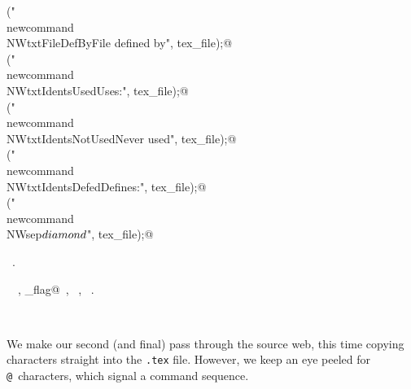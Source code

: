 \documentclass{report}
\begin{document}
\begin{flushleft}
\begin{minipage}{\linewidth}
\begin{list}{}{}
\mbox{}\verb@fputs("\\newcommand{\\NWtxtFileDefBy}{File defined by}\n", tex_file);@\\
\mbox{}\verb@fputs("\\newcommand{\\NWtxtIdentsUsed}{Uses:}\n", tex_file);@\\
\mbox{}\verb@fputs("\\newcommand{\\NWtxtIdentsNotUsed}{Never used}\n", tex_file);@\\
\mbox{}\verb@fputs("\\newcommand{\\NWtxtIdentsDefed}{Defines:}\n", tex_file);@\\
\mbox{}\verb@fputs("\\newcommand{\\NWsep}{${\\diamond}$}\n", tex_file);@\\
\mbox{}\verb@@{\NWsep}
\end{list}
\vspace{-1ex}
\footnotesize\addtolength{\baselineskip}{-1ex}
\begin{list}{}{\setlength{\itemsep}{-\parsep}\setlength{\itemindent}{-\leftmargin}}
\item \NWtxtMacroRefIn\ .
\end{list}
\vspace{-2ex}
\footnotesize\addtolength{\baselineskip}{-1ex}
\begin{list}{}{\setlength{\itemsep}{-\parsep}\setlength{\itemindent}{-\leftmargin}}
\item \NWtxtIdentsUsed\nobreak\  \verb@fputs@\nobreak\ , \verb@hyperref_flag@\nobreak\ , \verb@TRUE@\nobreak\ , \verb@Uses@\nobreak\ .\end{list}
\end{minipage}\\[4ex]
\end{flushleft}
We make our second (and final) pass through the source web, this time
copying characters straight into the \verb|.tex| file. However, we keep
an eye peeled for \verb|@|~characters, which signal a command sequence.
\end{document}
